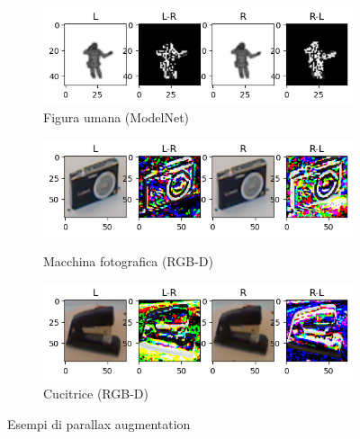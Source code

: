 \documentclass[italian,12pt,a4paper,oneside,final]{report}
\begin{document}
\begin{figure}[!ht]
\begin{subfigure}{0.4\textwidth}
\begin{subcaptionblock}{1.2\textwidth}
			\centering
			\includegraphics[width=1\linewidth]{modelnet_augment_human.png}
			\caption{Figura umana (ModelNet)}
			\label{fig:modelnet_augment_human}
		\end{subcaptionblock}%
	\end{subfigure}
	\hfill
	\begin{subfigure}{0.4\textwidth}
			\begin{subcaptionblock}{1.2\textwidth}
			\centering
			\includegraphics[width=1\linewidth]{rgbd_augment_camera.png}
			\caption{Macchina fotografica (RGB-D) }
			\label{fig:rgbd_augment_camera}
		\end{subcaptionblock}%
		\hfill
		\begin{subcaptionblock}{1.2\textwidth}
			\centering
			\includegraphics[width=1\linewidth]{rgbd_augment_stapler.png}
			\caption{Cucitrice (RGB-D)}
			\label{fig:rgbd_augment_stapler}
		\end{subcaptionblock}%
	\end{subfigure}
	\caption{Esempi di parallax augmentation}
	\label{fig:dataset_augment_samples}
\end{figure}
\end{document}

